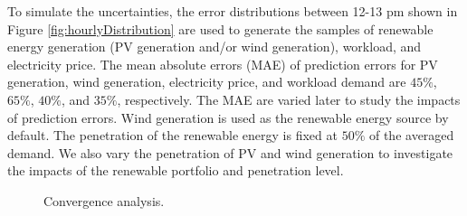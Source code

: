 To simulate the uncertainties, the error distributions between 12-13
pm shown in Figure \ref{fig:hourlyDistribution} are used to generate
the samples of renewable energy generation (PV generation and/or wind
generation), workload, and electricity price. The mean absolute errors
(MAE) of prediction errors for PV generation, wind generation,
electricity price, and workload demand are $45\%$, $65\%$, $40\%$, and
$35\%$, respectively. The MAE are varied later to study the impacts of
prediction errors. Wind generation is used as the renewable energy
source by default. The penetration of the renewable energy is fixed at
$50\%$ of the averaged demand. We also vary the penetration of PV and
wind generation to investigate the impacts of the renewable portfolio
and penetration level.

\begin{figure}[!t]
	\centering
	\vspace{-0.2cm}
	\vspace{-0.2cm}
	\caption{Convergence analysis.}
	\label{fig:convergence}
	\vspace{-0.6cm}
\end{figure}


